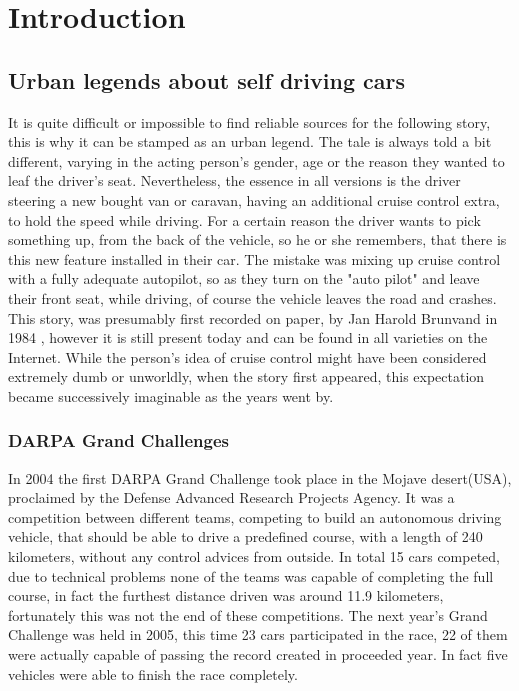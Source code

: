
\chapter{Introduction}\label{chapter:introduction}

\section{Urban legends about self driving cars}
It is quite difficult or impossible to find reliable sources for the following story, this is why it can be stamped as an urban legend. The tale is always told a bit different, varying in the acting person's gender, age or the reason they wanted to leaf the driver's seat. Nevertheless, the essence in all versions is the driver steering a new bought van or caravan, having an additional cruise control extra, to hold the speed while driving. For a certain reason the driver wants to pick something up, from the back of the vehicle, so he or she remembers, that there is this new feature installed in their car. The mistake was mixing up cruise control with a fully adequate autopilot, so as they turn on the "auto pilot" and leave their front seat, while driving, of course the vehicle leaves the road and crashes. \newline
This story, was presumably first recorded on paper, by Jan Harold Brunvand in 1984 \cite{brunvand}, however it is still present today and can be found in all varieties on the Internet. While the person's idea of cruise control might have been considered extremely dumb or unworldly, when the story first appeared, this expectation became successively imaginable as the years went by.

\subsection{DARPA Grand Challenges}
In 2004 the first DARPA Grand Challenge took place \cite{darpa2004} in the Mojave desert(USA), proclaimed by the Defense Advanced Research Projects Agency. It was a competition between different teams, competing to build an autonomous driving vehicle, that should be able to drive a predefined course, with a length of 240 kilometers, without any control advices from outside. In total 15 cars competed, due to technical problems none of the teams was capable of completing the full course, in fact the furthest distance driven was around 11.9 kilometers, fortunately this was not the end of these competitions. \newline
The next year's Grand Challenge was held in 2005, this time 23 cars participated in the race, 22 of them were actually capable of passing the record created in proceeded year. In fact five vehicles were able to finish the race completely.